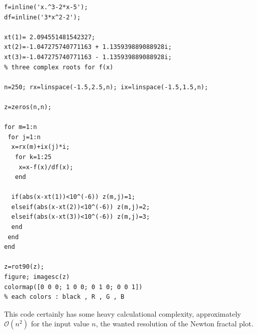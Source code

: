 \documentclass[paper=a4, fontsize=11pt]{scrartcl}
\begin{document}
\begin{lstlisting}[label=test.m,caption=newton\_fractal.m]
f=inline('x.^3-2*x-5');
df=inline('3*x^2-2');

xt(1)= 2.094551481542327;   
xt(2)=-1.047275740771163 + 1.135939889088928i;
xt(3)=-1.047275740771163 - 1.135939889088928i;
% three complex roots for f(x)

n=250; rx=linspace(-1.5,2.5,n); ix=linspace(-1.5,1.5,n);

z=zeros(n,n);

for m=1:n
 for j=1:n
  x=rx(m)+ix(j)*i;
   for k=1:25
    x=x-f(x)/df(x);
   end

  if(abs(x-xt(1))<10^(-6)) z(m,j)=1;
  elseif(abs(x-xt(2))<10^(-6)) z(m,j)=2;
  elseif(abs(x-xt(3))<10^(-6)) z(m,j)=3;
  end
 end
end

z=rot90(z);
figure; imagesc(z)
colormap([0 0 0; 1 0 0; 0 1 0; 0 0 1]) 
% each colors : black , R , G , B
\end{lstlisting}
\vspace{0.1in}

This code certainly has some heavy calculational complexity, approximately $\mathcal{O}(n^2)$ for the input value $n$, the wanted resolution of the Newton fractal plot. \\
\end{document}
